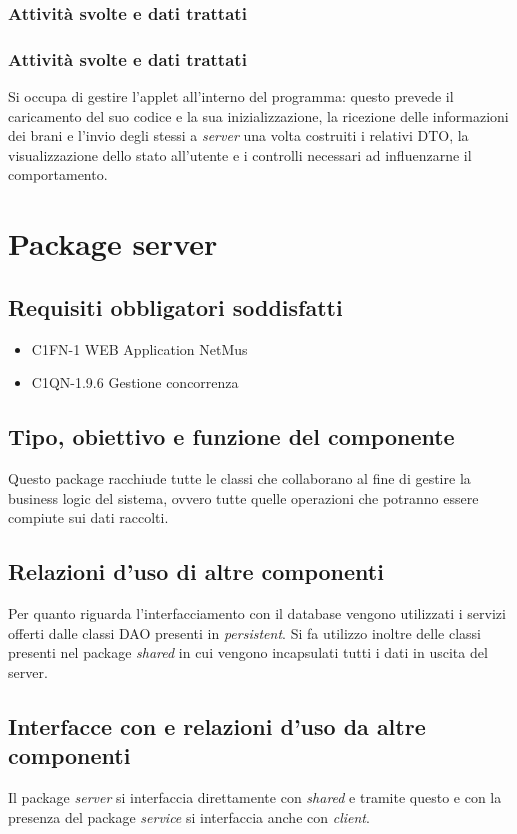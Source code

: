 \subsubsection*{Attivit\`a svolte e dati trattati}


\subsubsection*{Attivit\`a svolte e dati trattati}
Si occupa di gestire l'applet all'interno del programma: questo prevede il
caricamento del suo codice e la sua inizializzazione, la ricezione delle
informazioni dei brani e l'invio degli stessi a \emph{server} una volta
costruiti i relativi DTO, la visualizzazione dello stato all'utente e i
controlli necessari ad influenzarne il comportamento.

\newpage
\section{Package server}
\subsection*{Requisiti obbligatori soddisfatti}
\begin{itemize}
	\item C1FN-1 WEB Application NetMus
	\item C1QN-1.9.6 Gestione concorrenza
\end{itemize}
\subsection*{Tipo, obiettivo e funzione del componente} %
Questo package racchiude tutte le classi che collaborano al fine di gestire la
business logic del sistema, ovvero tutte quelle operazioni che potranno essere
compiute sui dati raccolti.

\subsection*{Relazioni d'uso di altre componenti}
Per quanto riguarda l'interfacciamento con il database vengono utilizzati i
servizi offerti dalle classi DAO presenti in \emph{persistent}. Si fa utilizzo
inoltre delle classi presenti nel package \emph{shared} in cui vengono
incapsulati tutti i dati in uscita del server.

\subsection*{Interfacce con e relazioni d'uso da altre componenti}
Il package \emph{server} si interfaccia direttamente con \emph{shared} e tramite
questo e con la presenza del package \emph{service} si interfaccia anche con
\emph{client}.


